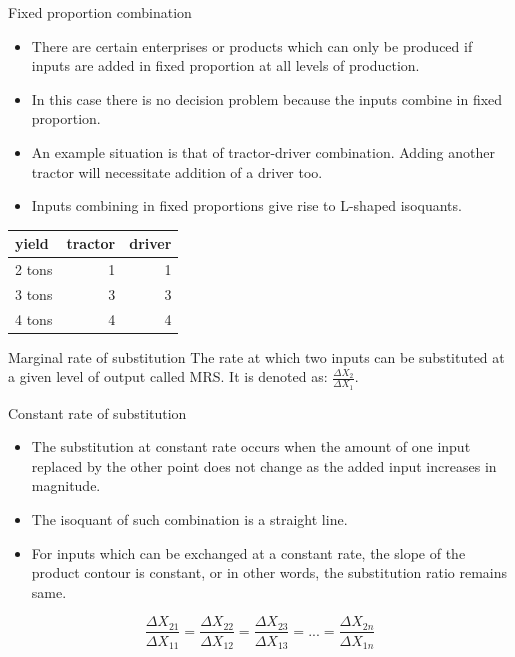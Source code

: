 \documentclass[12pt,ignorenonframetext,aspectratio=169]{beamer}
\providecommand{\tightlist}{%
  \setlength{\itemsep}{0pt}\setlength{\parskip}{0pt}}
\begin{document}
\begin{frame}{Fixed proportion combination}
\protect\hypertarget{fixed-proportion-combination}{}
\begin{itemize}
\tightlist
\item
  There are certain enterprises or products which can only be produced
  if inputs are added in fixed proportion at all levels of production.
\item
  In this case there is no decision problem because the inputs combine
  in fixed proportion.
\item
  An example situation is that of tractor-driver combination. Adding
  another tractor will necessitate addition of a driver too.
\item
  Inputs combining in fixed proportions give rise to L-shaped isoquants.
\end{itemize}

\begin{table}[H]
\centering
\begin{tabular}{lrr}
\toprule
yield & tractor & driver\\
\midrule
\rowcolor{gray!6}  2 tons & 1 & 1\\
3 tons & 3 & 3\\
\rowcolor{gray!6}  4 tons & 4 & 4\\
\bottomrule
\end{tabular}
\end{table}
\end{frame}

\begin{frame}{}
\protect\hypertarget{section-2}{}
\begin{block}{Marginal rate of substitution}
\protect\hypertarget{marginal-rate-of-substitution}{}
The rate at which two inputs can be substituted at a given level of
output called MRS. It is denoted as: \(\frac{\Delta X_2}{\Delta X_1}\).
\end{block}
\end{frame}

\begin{frame}{Constant rate of substitution}
\protect\hypertarget{constant-rate-of-substitution}{}
\begin{itemize}
\tightlist
\item
  The substitution at constant rate occurs when the amount of one input
  replaced by the other point does not change as the added input
  increases in magnitude.
\item
  The isoquant of such combination is a straight line.
\item
  For inputs which can be exchanged at a constant rate, the slope of the
  product contour is constant, or in other words, the substitution ratio
  remains same.
\end{itemize}

\[
\frac{\Delta X_{21}}{\Delta X_{11}} = \frac{\Delta X_{22}}{\Delta X_{12}} = \frac{\Delta X_{23}}{\Delta X_{13}} = ... = \frac{\Delta X_{2n}}{\Delta X_{1n}}
\]
\end{frame}
\end{document}
